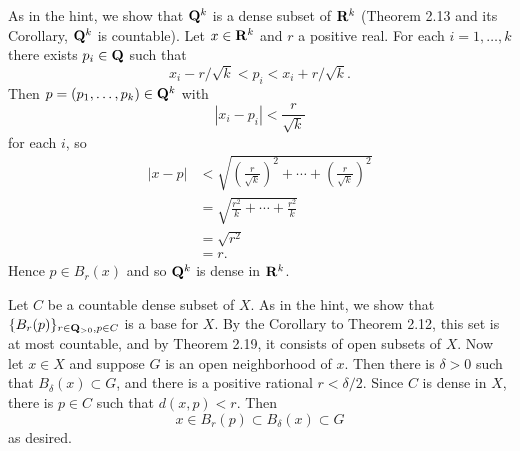 \begin{ex}
As in the hint, we show that $\mathbf{Q}^k$ is a dense subset of $\mathbf{R}^k$ (Theorem 2.13 and its Corollary, $\mathbf{Q}^k$ is countable). Let $x \in \mathbf{R}^k$ and $r$ a positive real. For each $i = 1, \ldots, k$ there exists $p_i \in \mathbf{Q}$ such that \[x_i - r/\sqrt{k} < p_i < x_i + r/\sqrt{k}.\] Then $p = (p_1, \ldots, p_k) \in \mathbf{Q}^k$ with \[|x_i-p_i| < \frac{r}{\sqrt{k}}\] for each $i$, so
\begin{align*}
|x-p| & < \sqrt{\left(\frac{r}{\sqrt{k}}\right)^2 + \cdots + \left(\frac{r}{\sqrt{k}}\right)^2}\\
& = \sqrt{\frac{r^2}{k} + \cdots + \frac{r^2}{k}}\\
& = \sqrt{r^2}\\
& = r.
\end{align*}
Hence $p \in B_r(x)$ and so $\mathbf{Q}^k$ is dense in $\mathbf{R}^k$.
\end{ex}

\begin{ex}
Let $C$ be a countable dense subset of $X$. As in the hint, we show that $\{B_r(p)\}_{r \in \mathbf{Q}_{> 0}, p \in C}$ is a base for $X$. By the Corollary to Theorem 2.12, this set is at most countable, and by Theorem 2.19, it consists of open subsets of $X$. Now let $x \in X$ and suppose $G$ is an open neighborhood of $x$. Then there is $\delta > 0$ such that $B_{\delta}(x) \subset G$, and there is a positive rational $r < \delta/2$. Since $C$ is dense in $X$, there is $p \in C$ such that $d(x, p) < r$. Then \[x \in B_r(p) \subset B_{\delta}(x) \subset G\] as desired.
\end{ex}

